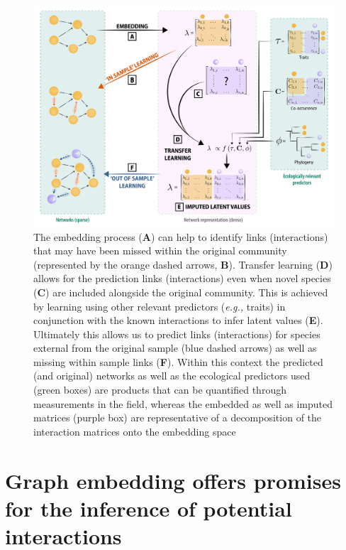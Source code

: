 \begin{figure}[h]
    \centering
    \includegraphics[width=\textwidth]{figures/conceptual_2.png}
    \caption{The embedding process (\textbf{A}) can help to identify links
(interactions) that may have been missed within the original community
(represented by the orange dashed arrows, \textbf{B}). Transfer learning
(\textbf{D}) allows for the prediction links (interactions) even when
novel species (\textbf{C}) are included alongside the original
community. This is achieved by learning using other relevant predictors
(\emph{e.g.,} traits) in conjunction with the known interactions to infer
latent values (\textbf{E}). Ultimately this allows us to predict links
(interactions) for species external from the original sample (blue
dashed arrows) as well as missing within sample links (\textbf{F}).
Within this context the predicted (and original) networks as well as the
ecological predictors used (green boxes) are products that can be
quantified through measurements in the field, whereas the embedded as
well as imputed matrices (purple box) are representative of a
decomposition of the interaction matrices onto the embedding
space}
    \label{fig:embedding}
\end{figure}

\section{Graph embedding offers promises for the inference of potential
interactions}\label{graph-embedding-offers-promises-for-the-inference-of-potential-interactions}

